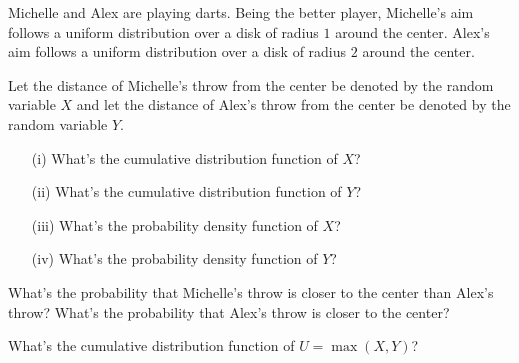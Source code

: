 \documentclass[11pt]{article}
\begin{document}

Michelle and Alex are playing darts.
Being the better player, Michelle's aim follows a uniform distribution over a disk of radius $1$ around the center. Alex's aim follows a uniform distribution over a disk of radius $2$ around the center. 

\begin{Parts}
    \Part Let the distance of Michelle's throw from the center be denoted by the random variable $X$ and let the distance of Alex's throw from the center be denoted by the random variable $Y$.
    \begin{enumerate}
    \item[(i)] What's the cumulative distribution function of $X$?
    \item[(ii)] What's the cumulative distribution function of $Y$?
    \item[(iii)] What's the probability density function of $X$?
    \item[(iv)] What's the probability density function of $Y$?
    \end{enumerate}
    
    \Part What's the probability that Michelle's throw is closer to the center than Alex's throw? What's the probability that Alex's throw is closer to the center? 
    
    \Part What's the cumulative distribution function of $U = \max(X,Y)$?

    
        
\end{Parts}
\end{document}
